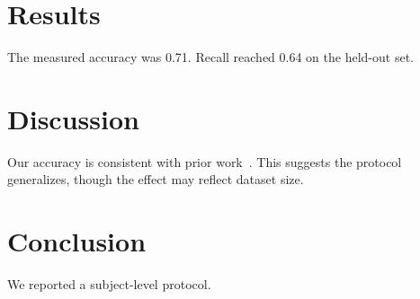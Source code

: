 
\section{Results}
The measured accuracy was 0.71. Recall reached 0.64 on the held-out set.
\section{Discussion}
Our accuracy is consistent with prior work~\cite{smith2020}. This suggests the
protocol generalizes, though the effect may reflect dataset size.
\section{Conclusion}
We reported a subject-level protocol.

